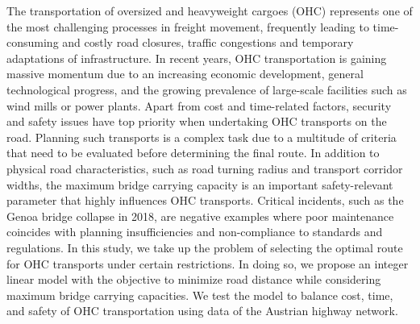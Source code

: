 
The transportation of oversized and heavyweight cargoes (OHC) represents one of the most challenging processes in freight movement, frequently leading to time-consuming and costly road closures, traffic congestions and temporary adaptations of infrastructure. In recent years, OHC transportation is gaining massive momentum due to an increasing economic development, general technological progress, and the growing prevalence of large-scale facilities such as wind mills or power plants. Apart from cost and time-related factors, security and safety issues have top priority when undertaking OHC transports on the road. Planning such transports is a complex task due to a multitude of criteria that need to be evaluated before determining the final route. In addition to physical road characteristics, such as road turning radius and transport corridor widths, the maximum bridge carrying capacity is an important safety-relevant parameter that highly influences OHC transports. Critical incidents, such as the Genoa bridge collapse in 2018, are negative examples where poor maintenance coincides with planning insufficiencies and non-compliance to standards and regulations. In this study, we take up the problem of selecting the optimal route for OHC transports under certain restrictions. In doing so, we propose an integer linear model with the objective to minimize road distance while considering maximum bridge carrying capacities. We test the model to balance cost, time, and safety of OHC transportation using data of the Austrian highway network.
